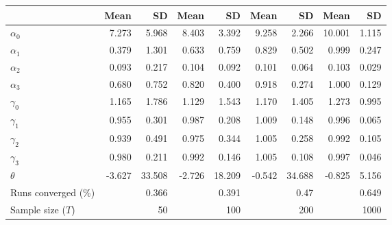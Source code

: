 
\begin{tabular}[t]{lrrrrrrrr}
\toprule
  & Mean & SD & Mean  & SD  & Mean   & SD   & Mean    & SD   \\
\midrule
$\alpha_{0}$ & 7.273 & 5.968 & 8.403 & 3.392 & 9.258 & 2.266 & 10.001 & 1.115\\
$\alpha_{1}$ & 0.379 & 1.301 & 0.633 & 0.759 & 0.829 & 0.502 & 0.999 & 0.247\\
$\alpha_{2}$ & 0.093 & 0.217 & 0.104 & 0.092 & 0.101 & 0.064 & 0.103 & 0.029\\
$\alpha_{3}$ & 0.680 & 0.752 & 0.820 & 0.400 & 0.918 & 0.274 & 1.000 & 0.129\\
$\gamma_{0}$ & 1.165 & 1.786 & 1.129 & 1.543 & 1.170 & 1.405 & 1.273 & 0.995\\
$\gamma_{1}$ & 0.955 & 0.301 & 0.987 & 0.208 & 1.009 & 0.148 & 0.996 & 0.065\\
$\gamma_{2}$ & 0.939 & 0.491 & 0.975 & 0.344 & 1.005 & 0.258 & 0.992 & 0.105\\
$\gamma_{3}$ & 0.980 & 0.211 & 0.992 & 0.146 & 1.005 & 0.108 & 0.997 & 0.046\\
$\theta$ & -3.627 & 33.508 & -2.726 & 18.209 & -0.542 & 34.688 & -0.825 & 5.156\\
Runs converged (\%) &  & 0.366 &  & 0.391 &  & 0.47 &  & 0.649\\
Sample size ($T$) &  & 50 &  & 100 &  & 200 &  & 1000\\
\bottomrule
\end{tabular}
